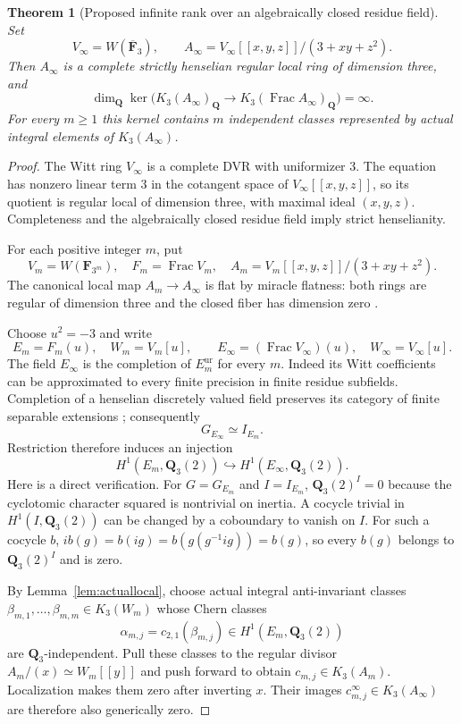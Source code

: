 \documentclass[11pt,a4paper]{article}
\newtheorem{theorem}{Theorem}[section]
\theoremstyle{remark}
\newcommand{\Q}{\mathbf Q}
\newcommand{\Frac}{\operatorname{Frac}}
\begin{document}
\begin{theorem}[Proposed infinite rank over an algebraically closed residue field]
\label{thm:stricthenselianinfinite}
Set
\[
 V_\infty=W(\overline{\mathbf F}_3),\qquad
 A_\infty=V_\infty[[x,y,z]]/(3+xy+z^2).
\]
Then $A_\infty$ is a complete strictly henselian regular local ring of
dimension three, and
\[
 \dim_{\Q}\ker\bigl(
   K_3(A_\infty)_{\Q}
       \longrightarrow K_3(\Frac A_\infty)_{\Q}\bigr)=\infty.
\]
For every $m\geq1$ this kernel contains $m$ independent classes
represented by actual integral elements of $K_3(A_\infty)$.
\end{theorem}
\begin{proof}
The Witt ring $V_\infty$ is a complete DVR with uniformizer $3$.
The equation has nonzero linear term $3$ in the cotangent space of
$V_\infty[[x,y,z]]$, so its quotient is regular local of dimension three,
with maximal ideal $(x,y,z)$. Completeness and the algebraically closed
residue field imply strict henselianity.

For each positive integer $m$, put
\[
 V_m=W(\mathbf F_{3^m}),\quad F_m=\Frac V_m,\quad
 A_m=V_m[[x,y,z]]/(3+xy+z^2).
\]
The canonical local map $A_m\to A_\infty$ is flat by miracle flatness:
both rings are regular of dimension three and the closed fiber has
dimension zero \cite[Tag~00R4]{StacksFlatness}.

Choose $u^2=-3$ and write
\[
 E_m=F_m(u),\quad W_m=V_m[u],\qquad
 E_\infty=(\Frac V_\infty)(u),\quad W_\infty=V_\infty[u].
\]
The field $E_\infty$ is the completion of $E_m^{\mathrm{ur}}$ for every
$m$. Indeed its Witt coefficients can be approximated to every finite
precision in finite residue subfields. Completion of a henselian
discretely valued field preserves its category of finite separable
extensions \cite[Lemma~4.2.1]{SaitoCompletion}; consequently
\[
 G_{E_\infty}\simeq I_{E_m}.
\]
Restriction therefore induces an injection
\begin{equation}\label{eq:inertiarestriction}
 H^1(E_m,\Q_3(2))\hookrightarrow H^1(E_\infty,\Q_3(2)).
\end{equation}
Here is a direct verification. For $G=G_{E_m}$ and $I=I_{E_m}$,
$\Q_3(2)^I=0$ because the cyclotomic character squared is nontrivial
on inertia. A cocycle trivial in $H^1(I,\Q_3(2))$ can be changed by a
coboundary to vanish on $I$. For such a cocycle $b$,
$i b(g)=b(ig)=b(g(g^{-1}ig))=b(g)$, so every $b(g)$ belongs to
$\Q_3(2)^I$ and is zero.

By Lemma~\ref{lem:actuallocal}, choose actual integral
anti-invariant classes
$\beta_{m,1},\ldots,\beta_{m,m}\in K_3(W_m)$ whose Chern classes
\[
 \alpha_{m,j}=c_{2,1}(\beta_{m,j})
       \in H^1(E_m,\Q_3(2))
\]
are $\Q_3$-independent. Pull these classes to the regular divisor
$A_m/(x)\simeq W_m[[y]]$ and push forward to obtain
$c_{m,j}\in K_3(A_m)$. Localization makes them zero after inverting
$x$. Their images $c^\infty_{m,j}\in K_3(A_\infty)$ are therefore
also generically zero.


\end{proof}
\end{document}
